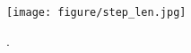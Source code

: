 \begin{figure}[t!]
\centering
\texttt{[image: figure/step\_len.jpg]}
\vspace{-.8em}
\caption{\small .}
\label{fig:step_len}
\end{figure}